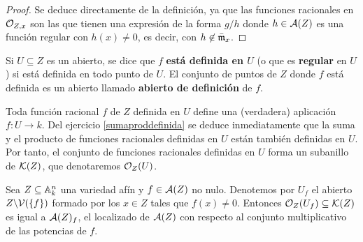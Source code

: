 \documentclass[ACGA.tex]{subfiles}
\begin{document}
\begin{proof}
 Se deduce directamente de la definición, ya que las funciones racionales en ${\mathcal O}_{Z,x}$ son las que tienen una expresión de la forma $g/h$ donde $h\in\mathcal{A}(Z)$ es una función regular con $h(x)\neq 0$, es decir, con $h\not\in \bar{{\mathfrak{m}}}_x$.
\end{proof}





 Si $U\subseteq Z$ es un abierto, se dice que $f$ {\bf está definida en $U$} (o que es {\bf regular} en $U$) si está definida en todo punto de $U$. El conjunto de puntos de $Z$ donde $f$ está definida es un abierto llamado {\bf abierto de definición} de $f$. 


Toda función racional $f$ de $Z$ definida en $U$ define una (verdadera) aplicación $f:U\to k$. Del ejercicio \ref{sumaproddefinida} se deduce inmediatamente que la suma y el producto de funciones racionales definidas en $U$ están también definidas en $U$. Por tanto, el conjunto de funciones racionales definidas en $U$ forma un subanillo de ${\mathcal K}(Z)$, que denotaremos ${\mathcal O}_Z(U)$.

\begin{prop}
 Sea $Z\subseteq\mathbb{A}^n_k$ una variedad afín y $f\in\mathcal{A}(Z)$ no nulo. Denotemos por $U_f$ el abierto $Z\backslash \mathcal{V}(\{f\})$ formado por los $x\in Z$ tales que $f(x)\neq 0$. Entonces ${\mathcal O}_Z(U_f)\subseteq{\mathcal K}(Z)$ es igual a $\mathcal{A}(Z)_f$, el localizado de $\mathcal{A}(Z)$ con respecto al conjunto multiplicativo de las potencias de $f$.
\end{prop}
\end{document}
